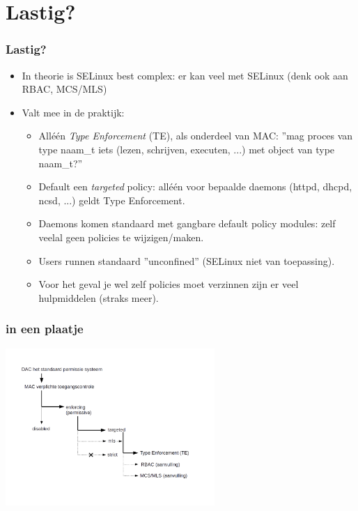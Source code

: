 \section{Lastig?}
\begin{styleframe}
    \frametitle{Lastig?}
\begin{itemize}
\pause
\item In theorie is SELinux best complex: er kan veel met SELinux (denk ook aan RBAC, MCS/MLS)
\pause
\item Valt mee in de praktijk:
	\begin{itemize}
	\pause
	\item All{\'e}{\'e}n {\it Type Enforcement} (TE), als onderdeel van MAC:
	''mag proces van type naam\_t iets (lezen, schrijven, executen, ...) met object van type naam\_t?'' \\
	\pause
    \item Default een {\it targeted} policy: all\'e\'en voor bepaalde daemons (httpd, dhcpd, ncsd, ...) geldt Type Enforcement.
	\pause
	\item Daemons komen standaard met gangbare default policy modules: zelf veelal geen policies te wijzigen/maken.
	\pause
	\item Users runnen standaard ''unconfined'' (SELinux niet van toepassing).
	\pause
	\item Voor het geval je wel zelf policies moet verzinnen zijn er veel hulpmiddelen (straks meer).
	\end{itemize}
\end{itemize}
\end{styleframe}

\begin{styleframe}
    \frametitle{in een plaatje}
 \includegraphics[width=300px]{samenvatting.png}
\end{styleframe}

